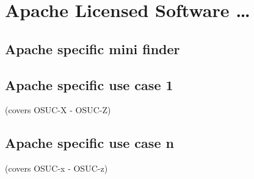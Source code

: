 %
%
%
%
%



\section{Apache Licensed Software \ldots}

\label{OSUC-01-Apache20} \label{OSUC-03-Apache20} 
\label{OSUC-06-Apache20} \label{OSUC-09-Apache20}

\label{OSUC-02-Apache20} \label{OSUC-04-Apache20} \label{OSUC-05-Apache20}
\label{OSUC-07-Apache20} \label{OSUC-08-Apache20} \label{OSUC-10-Apache20}

\subsection{Apache specific mini finder}

\subsection{Apache specific use case 1}
(covers OSUC-X - OSUC-Z)

\subsection{Apache specific use case n}
(covers OSUC-x - OSUC-z)




%
